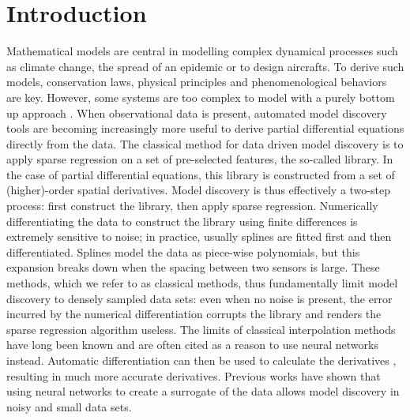 \documentclass{article} %
\begin{document}
\section{Introduction}
Mathematical models are central in modelling complex dynamical processes such as climate change, the spread of an epidemic or to design aircrafts. To derive such models, conservation laws, physical principles and phenomenological behaviors are key. However, some systems are too complex to model with a purely bottom up approach \cite{bolton2019applications,sanchez2020artificial}. When observational data is present, automated model discovery tools are becoming increasingly more useful to derive partial differential equations directly from the data. The classical method for data driven model discovery is to apply sparse regression on a set of pre-selected features, the so-called library. In the case of partial differential equations, this library is constructed from a set of (higher)-order spatial derivatives. Model discovery is thus effectively a two-step process: first construct the library, then apply sparse regression. Numerically differentiating the data to construct the library using finite differences is extremely sensitive to noise; in practice, usually splines are fitted first and then differentiated. Splines model the data as piece-wise polynomials, but this expansion breaks down when the spacing between two sensors is large. These methods, which we refer to as classical methods, thus fundamentally limit model discovery to densely sampled data sets: even when no noise is present, the error incurred by the numerical differentiation corrupts the library and renders the sparse regression algorithm useless. The limits of classical interpolation methods have long been known and are often cited as a reason to use neural networks instead. Automatic differentiation can then be used to calculate the derivatives \cite{baydin2017automatic}, resulting in much more accurate derivatives. Previous works \cite{long2018,both2019,both2020} have shown that using neural networks to create a surrogate of the data allows model discovery in noisy and small data sets. 
\end{document}
